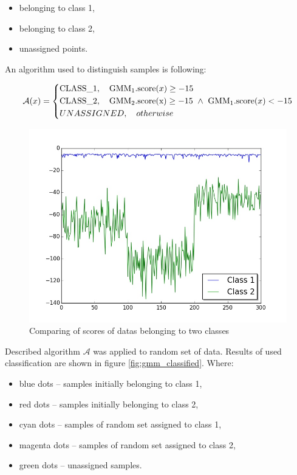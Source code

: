 \documentclass[magister]{dyplom}
\begin{document}
	\begin{itemize}
		\item belonging to class 1,
		\item belonging to class 2,
		\item unassigned points.
	\end{itemize}
	
	An algorithm used to distinguish samples is following:
	
	\begin{equation}
		\mathcal{A}(x) = \begin{dcases}
		\mathrm{CLASS\_1}, \quad   \mathrm{GMM}_1.\mathrm{score}(x) \geq -15 \\
		\mathrm{CLASS\_2}, \quad   \mathrm{GMM_2.score(x)} \geq -15 \  \land \ \mathrm{GMM}_1.\mathrm{score}(x) < -15\\
		UNASSIGNED, \quad otherwise \\
		\end{dcases}	
	\end{equation}
	
	\begin{figure}
		\centering
		\includegraphics[width=0.6\linewidth]{images/gmm_score_comp}
		\caption{Comparing of scores of datas belonging to two classes}
		\label{fig:gmm_score_comp}
	\end{figure}

	Described algorithm $\mathcal{A}$ was applied to random set of data. Results of used classification are shown in figure \ref{fig:gmm_classified}. Where:
	
	\begin{itemize}
		\item blue dots -- samples initially belonging to class 1,
		\item red dots -- samples initially belonging to class 2,
		\item cyan dots -- samples of random set assigned to class 1,
		\item magenta dots -- samples of random set assigned to class 2,
		\item green dots -- unassigned samples.
	\end{itemize}
	
\end{document}
